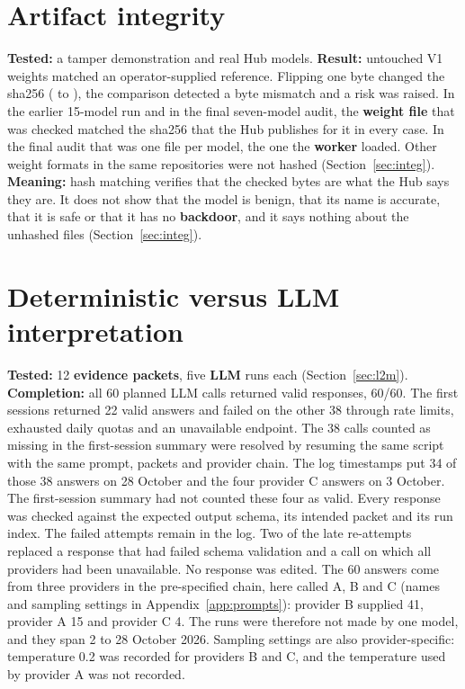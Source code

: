 \section{Artifact integrity}\label{sec:l7}
\textbf{Tested:} a tamper demonstration and real Hub models. \textbf{Result:} untouched V1 weights matched an operator-supplied reference. Flipping one byte changed the sha256 ( to ), the comparison detected a byte mismatch and a risk was raised. In the earlier 15-model run and in the final seven-model audit, the \textbf{weight file} that was checked matched the sha256 that the Hub publishes for it in every case. In the final audit that was one file per model, the one the \textbf{worker} loaded. Other weight formats in the same repositories were not hashed (Section~\ref{sec:integ}). \textbf{Meaning:} hash matching verifies that the checked bytes are what the Hub says they are. It does not show that the model is benign, that its name is accurate, that it is safe or that it has no \textbf{backdoor}, and it says nothing about the unhashed files (Section~\ref{sec:integ}).

\section{Deterministic versus LLM interpretation}\label{sec:l2}
\textbf{Tested:} 12 \textbf{evidence packets}, five \textbf{LLM} runs each (Section~\ref{sec:l2m}). \textbf{Completion:} all 60 planned LLM calls returned valid responses, 60/60. The first sessions returned 22 valid answers and failed on the other 38 through rate limits, exhausted daily quotas and an unavailable endpoint. The 38 calls counted as missing in the first-session summary were resolved by resuming the same script with the same prompt, packets and provider chain. The log timestamps put 34 of those 38 answers on 28 October and the four provider C answers on 3 October. The first-session summary had not counted these four as valid. Every response was checked against the expected output schema, its intended packet and its run index. The failed attempts remain in the log. Two of the late re-attempts replaced a response that had failed schema validation and a call on which all providers had been unavailable. No response was edited. The 60 answers come from three providers in the pre-specified chain, here called A, B and C (names and sampling settings in Appendix~\ref{app:prompts}): provider B supplied 41, provider A 15 and provider C 4. The runs were therefore not made by one model, and they span 2 to 28 October 2026. Sampling settings are also provider-specific: temperature 0.2 was recorded for providers B and C, and the temperature used by provider A was not recorded.

